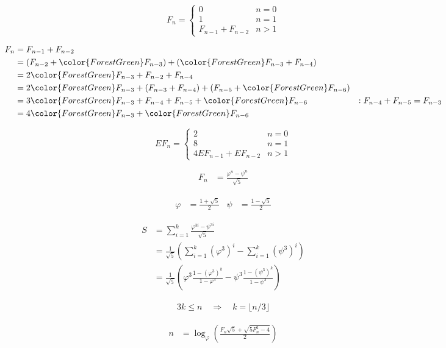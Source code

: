\[F_n = 
\left\{
  \begin{array}{lr}
    0 &  n = 0\\
    1 &  n = 1\\
    F_{n-1} + F_{n-2} & n > 1
  \end{array}
\right.
\]

\begin{align*}
  F_n  &= F_{n-1} + F_{n-2}\\
      &= (F_{n-2} + {\color{ForestGreen}F_{n-3}} ) + ({\color{ForestGreen}F_{n-3}}  + F_{n-4})\\
      &= 2 {\color{ForestGreen}F_{n-3}} + F_{n-2} + F_{n-4} \\
      &= 2 {\color{ForestGreen}F_{n-3}} + (F_{n-3} + F_{n-4}) + (F_{n-5} + {\color{ForestGreen}F_{n-6}} ) \\
      &= 3 {\color{ForestGreen}F_{n-3}} + F_{n-4} + F_{n-5} + {\color{ForestGreen}F_{n-6}} & : F_{n-4} + F_{n-5} = F_{n-3} \\
      &= 4 {\color{ForestGreen}F_{n-3}} + {\color{ForestGreen}F_{n-6}}
\end{align*}

\[EF_n = 
\left\{
  \begin{array}{lr}
    2 &  n = 0\\
    8 &  n = 1\\
    4 EF_{n-1} + EF_{n-2} & n > 1
  \end{array}
\right.
\]

\begin{align*}
    F_n &= \frac{\varphi^n - \psi^n}{\sqrt{5}}
\end{align*}

\begin{align*}
    \varphi &= \frac{1 + \sqrt{5}}{2} & \psi &= \frac{1 - \sqrt{5}}{2}
\end{align*}

\begin{align*}
  S &= \sum_{i=1}^{k} \frac{\varphi^{3i} - \psi^{3i}}{\sqrt{5}} \\
  &= \frac{1}{\sqrt{5}}(\sum_{i=1}^{k} {(\varphi^3)}^i - \sum_{i=1}^{k} {(\psi^3)}^i) \\
  &= \frac{1}{\sqrt{5}}(\varphi^3 \frac{1 - {(\varphi^3)}^k}{1 -  \varphi^{3}} - \psi^3 \frac{1 - {(\psi^3)}^k}{1 -  \psi^{3}})
\end{align*}

\begin{align*}
  3k \le n \quad \Rightarrow \quad k = \lfloor n/3 \rfloor
\end{align*}

\begin{align*}
  n &=  \log_{\varphi}(\frac{F_n \sqrt{5} + \sqrt{5F_n^2 - 4}}{2} )
\end{align*}